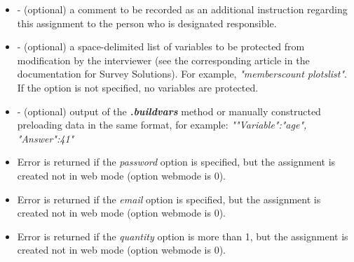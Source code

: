 \begin{itemize}
\item {} - (optional) a comment to be recorded as an additional
      instruction regarding this assignment to the person who is designated
      responsible.

\item {} - (optional) a space-delimited list of variables to
      be protected from modification by the interviewer (see the corresponding
      article in the documentation for Survey Solutions). For example,
      \textit{"memberscount plotslist"}. If the option is not specified, no
      variables are protected.

\item {} - (optional) output of the \textit{\textbf{.buildvars}}
      method or manually constructed preloading data in the same format, for
      example: \textit{"{"Variable":"age", "Answer":41}"}

\end{itemize}

\errheader
\begin{itemize}
    \item Error  is returned if the \textit{password} option is
    specified, but the assignment is created not in web mode (option webmode is
    0).

    \item Error  is returned if the \textit{email} option is
    specified, but the assignment is created not in web mode (option webmode is
    0).

    \item Error  is returned if the \textit{quantity} option is
    more than 1, but the assignment is created not in web mode (option webmode is
    0).
\end{itemize}

